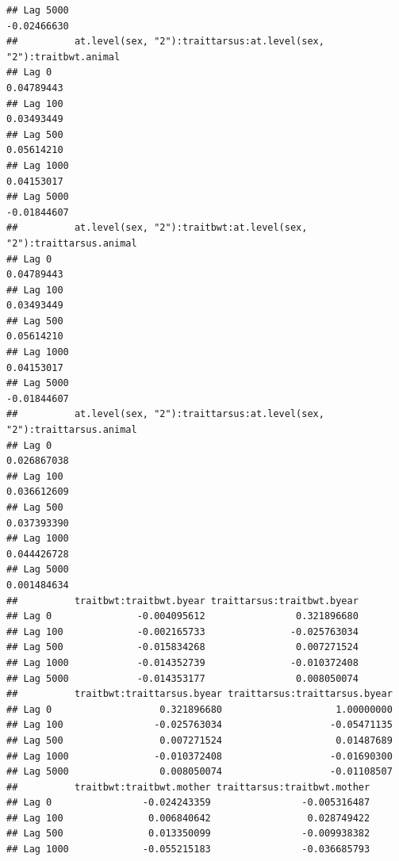\documentclass[
  12pt,
]{book}
\begin{document}
\begin{verbatim}
## Lag 5000                                                    -0.02466630
##          at.level(sex, "2"):traittarsus:at.level(sex, "2"):traitbwt.animal
## Lag 0                                                           0.04789443
## Lag 100                                                         0.03493449
## Lag 500                                                         0.05614210
## Lag 1000                                                        0.04153017
## Lag 5000                                                       -0.01844607
##          at.level(sex, "2"):traitbwt:at.level(sex, "2"):traittarsus.animal
## Lag 0                                                           0.04789443
## Lag 100                                                         0.03493449
## Lag 500                                                         0.05614210
## Lag 1000                                                        0.04153017
## Lag 5000                                                       -0.01844607
##          at.level(sex, "2"):traittarsus:at.level(sex, "2"):traittarsus.animal
## Lag 0                                                             0.026867038
## Lag 100                                                           0.036612609
## Lag 500                                                           0.037393390
## Lag 1000                                                          0.044426728
## Lag 5000                                                          0.001484634
##          traitbwt:traitbwt.byear traittarsus:traitbwt.byear
## Lag 0               -0.004095612                0.321896680
## Lag 100             -0.002165733               -0.025763034
## Lag 500             -0.015834268                0.007271524
## Lag 1000            -0.014352739               -0.010372408
## Lag 5000            -0.014353177                0.008050074
##          traitbwt:traittarsus.byear traittarsus:traittarsus.byear
## Lag 0                   0.321896680                    1.00000000
## Lag 100                -0.025763034                   -0.05471135
## Lag 500                 0.007271524                    0.01487689
## Lag 1000               -0.010372408                   -0.01690300
## Lag 5000                0.008050074                   -0.01108507
##          traitbwt:traitbwt.mother traittarsus:traitbwt.mother
## Lag 0                -0.024243359                -0.005316487
## Lag 100               0.006840642                 0.028749422
## Lag 500               0.013350099                -0.009938382
## Lag 1000             -0.055215183                -0.036685793

\end{verbatim}
\end{document}
